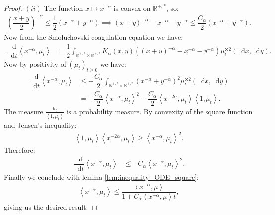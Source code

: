 \documentclass[11pt,a4paper]{article}
\newcommand{\RR}{\mathbb{R}}
\newcommand{\Proc}[1]{\left(#1\right)_{t\geq 0}}
\newcommand{\dd}{\mathop{}\!\mathrm{d}}
\newtheorem{proposition}[theorem]{Proposition}
\begin{document}
\begin{proof}
    $(ii)$ The function $x \mapsto x^{-\alpha}$ is convex on $\RR^{+,*}$, so:
    \begin{align*}
        \left(\dfrac{x + y}{2}\right)^{-\alpha} \leq \dfrac{1}{2}  \left(x^{-\alpha} + y^{-\alpha}\right) \implies 
        \left(x + y\right)^{-\alpha} - x^{-\alpha} - y^{-\alpha} \leq \dfrac{C_\alpha}{2} \left( x^{-\alpha} + y^{-\alpha}\right).
    \end{align*}
    Now from the Smoluchovski coagulation equation we have:
    \begin{align*}
        \dfrac{\dd}{\dd t} \left\langle x^{-\alpha},\mu_t\right\rangle &= \dfrac12\int_{\RR^{+,*}\times \RR^{+,*}} K_\alpha(x,y) \left((x + y)^{-\alpha}- x^{-\alpha} - y^{-\alpha} \right) \mu_t^{\otimes 2}(\dd x, \dd y).
    \end{align*}
    Now by positivity of $\Proc{\mu_t}$ we have:
    \begin{align*}
        \dfrac{\dd}{\dd t} \left\langle x^{-\alpha},\mu_t\right\rangle &\leq -\dfrac{C_\alpha}{2}\int_{\RR^{+,*}\times \RR^{+,*}} \left(x^{-\alpha} + y^{-\alpha} \right)^2 \mu_t^{\otimes 2}(\dd x, \dd y)
        \\
        &= -\dfrac{C_\alpha}{2} \left\langle x^{-\alpha}, \mu_t\right\rangle^2 - \dfrac{C_\alpha}{2}\left\langle x^{-2\alpha}, \mu_t\right\rangle \left\langle 1, \mu_t\right\rangle.
    \end{align*}
   The measure $\frac{\mu_t}{\left\langle 1, \mu_t\right\rangle}$ is a probability measure. By convexity of the square function and Jensen's inequality:
   \begin{align*}
       \left\langle 1, \mu_t\right\rangle\left\langle x^{-2\alpha}, \mu_t\right\rangle \geq \left\langle x^{-\alpha}, \mu_t\right\rangle^2.
   \end{align*}
   Therefore:
    \begin{align*}
        \dfrac{\dd}{\dd t} \left\langle x^{-\alpha},\mu_t\right\rangle &\leq -C_\alpha \left\langle x^{-\alpha}, \mu_t\right\rangle^2.
    \end{align*}
    Finally we conclude with lemma \ref{lem:inequality_ODE_square}:
    \begin{align*}
        \left\langle x^{-\alpha},\mu_t\right\rangle \leq \dfrac{\left\langle x^{-\alpha}, \mu \right\rangle}{1 + C_\alpha\left\langle x^{-\alpha}, \mu \right\rangle t },
    \end{align*}
    giving us the desired result.
\end{proof}
\end{document}
